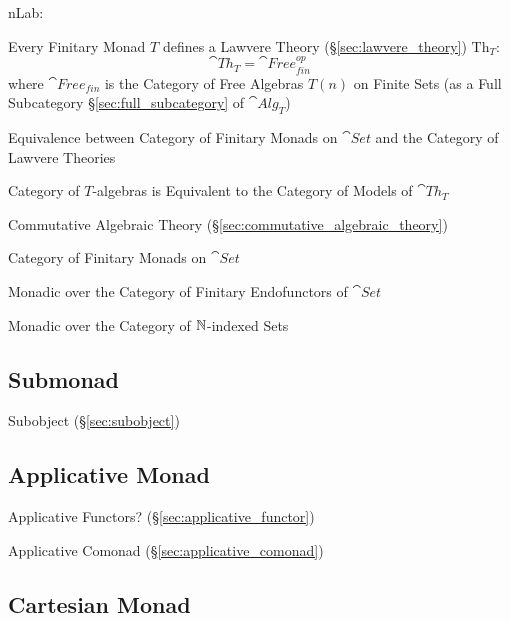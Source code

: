 nLab:

Every Finitary Monad $T$ defines a Lawvere Theory (\S\ref{sec:lawvere_theory})
$\mathrm{Th}_T$:
\[
  \cat{Th}_T = \cat{Free}^{op}_{fin}
\]
where $\cat{Free}_{fin}$ is the Category of Free Algebras $T(n)$ on
Finite Sets (as a Full Subcategory \S\ref{sec:full_subcategory} of
$\cat{Alg}_T$) %

Equivalence between Category of Finitary Monads on $\cat{Set}$ and the
Category of Lawvere Theories %

Category of $T$-algebras is Equivalent to the Category of Models of
$\cat{Th}_T$ %

Commutative Algebraic Theory
(\S\ref{sec:commutative_algebraic_theory})

Category of Finitary Monads on $\cat{Set}$

Monadic over the Category of Finitary Endofunctors of $\cat{Set}$

Monadic over the Category of $\mathbb{N}$-indexed Sets



\subsection{Submonad}\label{sec:submonad}

Subobject (\S\ref{sec:subobject})



\subsection{Applicative Monad}\label{sec:applicative_monad}

Applicative Functors? (\S\ref{sec:applicative_functor})

Applicative Comonad (\S\ref{sec:applicative_comonad})



\subsection{Cartesian Monad}\label{sec:cartesian_monad}

